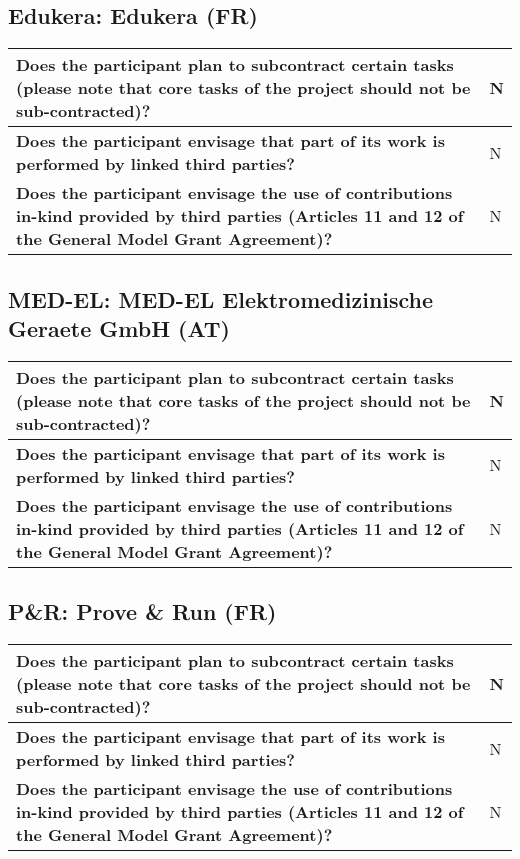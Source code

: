 \subsection{Edukera: Edukera (FR)}

\begin{longtable}{|p{}|p{}|}
\hline
{\bf Does the participant plan to subcontract certain tasks (please
  note that core tasks of the project should not be sub-contracted)?}
&
N
\\
\hline
{\bf Does the participant envisage that  part of its work is performed
  by linked third parties?}
&
N
\\
\hline
{\bf Does the participant envisage the use of contributions in-kind
provided by third parties (Articles 11 and 12 of the General Model
Grant Agreement)?}
&
N
\\
\hline
\end{longtable}


\subsection{MED-EL: MED-EL Elektromedizinische Geraete GmbH (AT)}

\begin{longtable}{|p{}|p{}|}
\hline
{\bf Does the participant plan to subcontract certain tasks (please
  note that core tasks of the project should not be sub-contracted)?}
&
N
\\
\hline
{\bf Does the participant envisage that  part of its work is performed
  by linked third parties?}
&
N
\\
\hline
{\bf Does the participant envisage the use of contributions in-kind
provided by third parties (Articles 11 and 12 of the General Model
Grant Agreement)?}
&
N
\\
\hline
\end{longtable}


\subsection{P\&R: Prove \& Run (FR)}

\begin{longtable}{|p{}|p{}|}
\hline
{\bf Does the participant plan to subcontract certain tasks (please
  note that core tasks of the project should not be sub-contracted)?}
&
N
\\
\hline
{\bf Does the participant envisage that  part of its work is performed
  by linked third parties?}
&
N
\\
\hline
{\bf Does the participant envisage the use of contributions in-kind
provided by third parties (Articles 11 and 12 of the General Model
Grant Agreement)?}
&
N
\\
\hline
\end{longtable}


